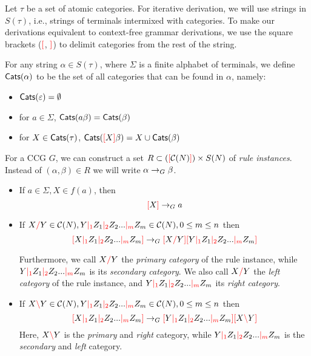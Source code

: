 \documentclass[main.tex]{subfiles}
\begin{document}
Let $\tau$ be a set of atomic categories.
For iterative derivation, we will use strings in $S(\tau)$,
i.e., strings of terminals intermixed with categories. To make our derivations
equivalent to context-free grammar derivations, we use the square
brackets ($\textcolor{red}{[}$, $\textcolor{red}{]}$) to delimit categories from the rest of the string.

\begin{defn}
    For any string $\alpha \in S(\tau)$, where $\Sigma$ is a
    finite alphabet of terminals, we define $\mathsf{Cats}( \alpha )$ to be the set of all
    categories that
    can be found in $\alpha$, namely:
    \begin{itemize}
        \item $\mathsf{Cats}( \varepsilon ) = \emptyset$
        \item for $a \in \Sigma$, $\mathsf{Cats}( a\beta ) = \mathsf{Cats}( \beta )$
        \item for $X \in \mathsf{Cats}( \tau )$, $\mathsf{Cats}( \textcolor{red}{[} X \textcolor{red}{]} \beta ) = X \cup \mathsf{Cats}( \beta )$
    \end{itemize}
\end{defn}

\begin{defn}\label{def:ccg:rules}
    For a CCG $G$, we can construct a set $R \subset (\textcolor{red}{[} \mathcal{C}( N ) \textcolor{red}{]}) \times S(N)$
    of \emph{rule instances}. Instead of $(\alpha, \beta) \in R$ we will write
    $\alpha \rightarrow_G \beta$.

    \begin{itemize}
        \item If $ a \in \Sigma, X \in f(a) $, then \[ \textcolor{red}{[} X \textcolor{red}{]} \rightarrow_G a \]
        \item If $ X \textcolor{red}{/} Y \in \mathcal{C}( N ), Y \textcolor{red}{|_{1}} Z_1 \textcolor{red}{|_{2}} Z_2 ... \textcolor{red}{|_{m}} Z_m \in \mathcal{C}( N ), 0 \leq m \leq n $
            then \[ \textcolor{red}{[} X \textcolor{red}{|_{1}} Z_1 \textcolor{red}{|_{2}} Z_2 ... \textcolor{red}{|_{m}} Z_m \textcolor{red}{]} \rightarrow_G \textcolor{red}{[} X \textcolor{red}{/} Y \textcolor{red}{]} \textcolor{red}{[} Y \textcolor{red}{|_{1}} Z_1 \textcolor{red}{|_{2}} Z_2 ... \textcolor{red}{|_{m}} Z_m \textcolor{red}{]} \]

            Furthermore, we call $ X \textcolor{red}{/} Y $ the \emph{primary category} of the rule
            instance, while $ Y \textcolor{red}{|_{1}} Z_1 \textcolor{red}{|_{2}} Z_2 ... \textcolor{red}{|_{m}} Z_m $ is its
            \emph{secondary category}.
            We also call $ X \textcolor{red}{/} Y $ the \emph{left category} of the rule instance,
            and $  Y \textcolor{red}{|_{1}} Z_1 \textcolor{red}{|_{2}} Z_2 ... \textcolor{red}{|_{m}} Z_m $ its \emph{right category}.
        \item If $ X \textcolor{red}{\backslash} Y \in \mathcal{C}( N ), Y \textcolor{red}{|_{1}} Z_1 \textcolor{red}{|_{2}} Z_2 ... \textcolor{red}{|_{m}} Z_m \in \mathcal{C}( N ), 0 \leq m \leq n $
            then \[ \textcolor{red}{[} X \textcolor{red}{|_{1}} Z_1 \textcolor{red}{|_{2}} Z_2 ... \textcolor{red}{|_{m}} Z_m \textcolor{red}{]} \rightarrow_G \textcolor{red}{[} Y \textcolor{red}{|_{1}} Z_1 \textcolor{red}{|_{2}} Z_2 ... \textcolor{red}{|_{m}} Z_m \textcolor{red}{]} \textcolor{red}{[} X \textcolor{red}{\backslash} Y \textcolor{red}{]} \]
            Here, $ X \textcolor{red}{\backslash} Y $ is the \emph{primary} and \emph{right} category,
            while $ Y \textcolor{red}{|_{1}} Z_1 \textcolor{red}{|_{2}} Z_2 ... \textcolor{red}{|_{m}} Z_m $ is the \emph{secondary}
            and \emph{left} category.
    \end{itemize}
\end{defn}
\end{document}
